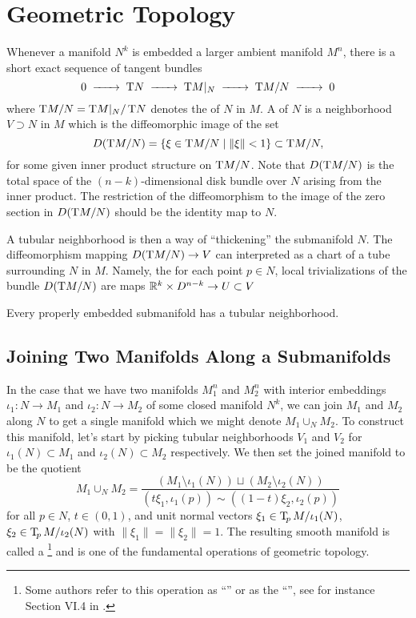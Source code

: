 \section{Geometric Topology}\label{sec:differential-topology}

Whenever a manifold $N^k$ is embedded a larger ambient manifold $M^n$, there is a short exact sequence of tangent bundles
\[
		0 \lkxto \T N\lkxto \T M|_N \lkxto \T M/N \lkxto 0
\]
where $\operatorname{T\!} M/N=\operatorname{T\!} M|_N / \operatorname{T\!} N$ denotes the  of $N$ in $M$. A  of $N$ is a neighborhood $V\supset N$ in $M$ which is the diffeomorphic image of the set
\[
	D(\operatorname{T\!} M/N) = \{\xi \in \operatorname{T\!} M/N \mid \|\xi\| <1 \}\subset \operatorname{T\!} M/N,
\]
for some given inner product structure on $\operatorname{T\!} M/N$. Note that $D(\operatorname{T\!} M/N)$ is the total space of the $(n-k)$-dimensional disk bundle over $N$ arising from the inner product. The restriction of the diffeomorphism to the image of the zero section in $D(\operatorname{T\!} M/N)$ should be the identity map to $N$. 

A tubular neighborhood is then a way of ``thickening'' the submanifold $N$.
The diffeomorphism mapping $D(\operatorname{T\!} M/N) \to V$ can interpreted as a chart of a tube surrounding $N$ in $M$. Namely, the for each point $p\in N$, local trivializations of the bundle $D(\operatorname{T\!} M/N)$ are maps $\mathbb{R}^k \times D^{n-k}\to U\subset V$


\begin{theorem}
	Every properly embedded submanifold has a tubular neighborhood.
\end{theorem}

\begin{theorem}
\end{theorem}


\subsection{Joining Two Manifolds Along a Submanifolds}

In the case that we have two manifolds $M_1^n$ and $M_2^n$ with interior embeddings $\iota_1 : N \to M_1$ and $\iota_2 : N\to M_2$ of some closed manifold $N^k$, we can join $M_1$ and $M_2$ along $N$ to get a single manifold which we might denote $M_1\cup_N M_2$.
To construct this manifold, let's start by picking tubular neighborhoods $V_1$ and $V_2$ for $\iota_1(N)\subset M_1$ and $\iota_2(N)\subset M_2$ respectively. We then set the joined manifold to be the quotient
\begin{equation}\label{eq:join-definition}
	M_1\cup_N M_2 = \frac{(M_1\setminus \iota_1(N))\sqcup (M_2\setminus \iota_2(N))}{(t\xi_1, \iota_1(p)) \sim ((1-t)\xi_2, \iota_2(p))}
\end{equation}
for all $p\in N$, $t\in(0,1)$, and unit normal vectors $\xi_1\in \operatorname{T\!}_p M/\iota_1(N)$, $\xi_2\in \operatorname{T\!}_p M/\iota_2(N)$ with $\|\xi_1\|=\|\xi_2\|=1$. The resulting smooth manifold is called a \footnote{Some authors refer to this operation as ``'' or as the ``'', see for instance Section VI.4 in \cite{kosinski1993differential}.} and is one of the fundamental operations of geometric topology.


